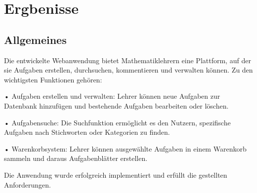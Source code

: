 \section{Ergbenisse}
\subsection{Allgemeines}

Die entwickelte Webanwendung bietet Mathematiklehrern eine Plattform, auf der sie Aufgaben erstellen, durchsuchen, kommentieren und verwalten können. Zu den wichtigsten Funktionen gehören:

•	Aufgaben erstellen und verwalten: Lehrer können neue Aufgaben zur Datenbank hinzufügen und bestehende Aufgaben bearbeiten oder löschen.

•	Aufgabensuche: Die Suchfunktion ermöglicht es den Nutzern, spezifische Aufgaben nach Stichworten oder Kategorien zu finden.

•	Warenkorbsystem: Lehrer können ausgewählte Aufgaben in einem Warenkorb sammeln und daraus Aufgabenblätter erstellen.

Die Anwendung wurde erfolgreich implementiert und erfüllt die gestellten Anforderungen.



